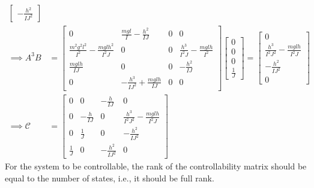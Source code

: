 \begin{align*}
\begin{bmatrix}
        -\frac{h^2}{IJ^2}
    \end{bmatrix}
    \\
    \implies
    A^{3}B
     & =
    \begin{bmatrix}
        0                                               & \frac{m g l}{I}-\frac{h^2}{IJ}        & 0 & 0                                     \\
        \frac{m^2 g^2 l^2}{I^2}-\frac{m g l h^2}{I^2 J} & 0                                     & 0 & \frac{h^3}{I^2 J}-\frac{m g l h}{I^2} \\
        \frac{m g l h}{IJ}                              & 0                                     & 0 & -\frac{h^2}{IJ}                       \\
        0                                               & -\frac{h^3}{I J^2}+\frac{m g l h}{IJ} & 0 & 0
    \end{bmatrix}
    \begin{bmatrix}
        0 \\ 0 \\ 0 \\ \frac{1}{J}
    \end{bmatrix}
    =
    \begin{bmatrix}
        0                                         \\
        \frac{h^3}{I^2 J^2}-\frac{m g l h}{I^2 J} \\
        -\frac{h^2}{IJ^2}                         \\
        0
    \end{bmatrix}
    \\
    \implies
    \mathcal{C}
     & =
    \begin{bmatrix}
        0           & 0             & -\frac{h}{IJ}     & 0                                         \\
        0           & -\frac{h}{IJ} & 0                 & \frac{h^3}{I^2 J^2}-\frac{m g l h}{I^2 J} \\
        0           & \frac{1}{J}   & 0                 & -\frac{h^2}{IJ^2}                         \\
        \frac{1}{J} & 0             & -\frac{h^2}{IJ^2} & 0
    \end{bmatrix}
\end{align*}
For the system to be controllable, the rank of the controllability matrix should be equal to the number of states, i.e., it should be full rank.

